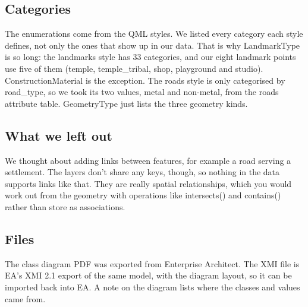 \documentclass[11pt,a4paper]{article}
\begin{document}
\subsection*{Categories}
The enumerations come from the QML styles. We listed every category each style defines, not only the ones that show up in our data. That is why LandmarkType is so long: the landmarks style has 33 categories, and our eight landmark points use five of them (temple, temple\_tribal, shop, playground and studio). ConstructionMaterial is the exception. The roads style is only categorised by road\_type, so we took its two values, metal and non-metal, from the roads attribute table. GeometryType just lists the three geometry kinds.

\subsection*{What we left out}
We thought about adding links between features, for example a road serving a settlement. The layers don't share any keys, though, so nothing in the data supports links like that. They are really spatial relationships, which you would work out from the geometry with operations like intersects() and contains() rather than store as associations.

\subsection*{Files}
The class diagram PDF was exported from Enterprise Architect. The XMI file is EA's XMI 2.1 export of the same model, with the diagram layout, so it can be imported back into EA. A note on the diagram lists where the classes and values came from.
\end{document}
